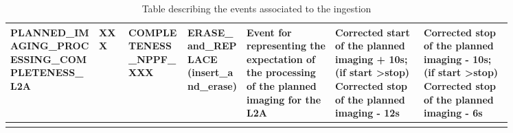 \begin{landscape}
\begin{longtable}{|M{0.15\linewidth}|M{0.05\linewidth}|M{0.10\linewidth}|M{0.10\linewidth}|M{0.15\linewidth}|M{0.15\linewidth}|M{0.15\linewidth}|}
\textbf{PLANNED\_IMAGING\_PROCESSING\_COMPLETENESS\_L2A} & XXX & \- COMPLETENESS\_NPPF\_XXX & ERASE\_and\_REPLACE (insert\_and\_erase) & Event for representing the \textbf{expectation of the processing of the planned imaging for the L2A} & Corrected start of the planned imaging + 10s; (if start \textgreater  stop) Corrected stop of the planned imaging - 12s & Corrected stop of the planned imaging - 10s; (if start \textgreater  stop) Corrected stop of the planned imaging - 6s \\ \hline
\caption{Table describing the events associated to the ingestion}
\label{tb:description_events_ingestion_nppf}
\end{longtable}
\end{landscape}
